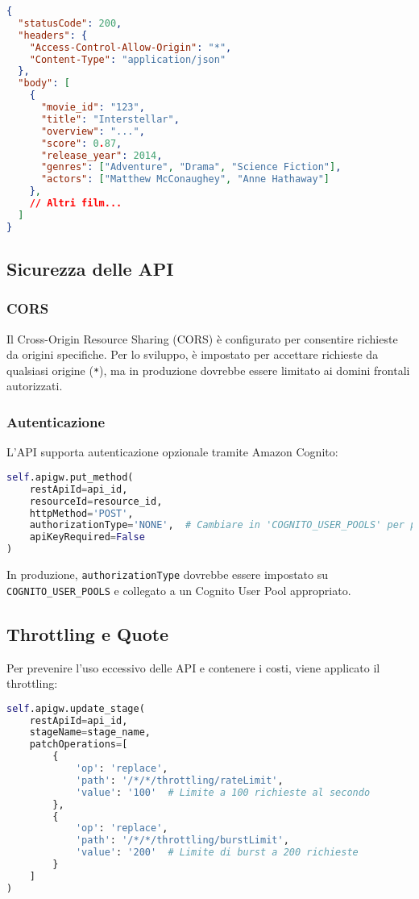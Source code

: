 \documentclass[11pt,a4paper]{article}
\begin{document}
\begin{lstlisting}[language=json]
{
  "statusCode": 200,
  "headers": {
    "Access-Control-Allow-Origin": "*",
    "Content-Type": "application/json"
  },
  "body": [
    {
      "movie_id": "123",
      "title": "Interstellar",
      "overview": "...",
      "score": 0.87,
      "release_year": 2014,
      "genres": ["Adventure", "Drama", "Science Fiction"],
      "actors": ["Matthew McConaughey", "Anne Hathaway"]
    },
    // Altri film...
  ]
}
\end{lstlisting}

\subsection{Sicurezza delle API}

\subsubsection{CORS}
Il Cross-Origin Resource Sharing (CORS) è configurato per consentire richieste da origini specifiche. Per lo sviluppo, è impostato per accettare richieste da qualsiasi origine (\texttt{*}), ma in produzione dovrebbe essere limitato ai domini frontali autorizzati.

\subsubsection{Autenticazione}
L'API supporta autenticazione opzionale tramite Amazon Cognito:

\begin{lstlisting}[language=Python]
self.apigw.put_method(
    restApiId=api_id,
    resourceId=resource_id,
    httpMethod='POST',
    authorizationType='NONE',  # Cambiare in 'COGNITO_USER_POOLS' per produzione
    apiKeyRequired=False
)
\end{lstlisting}

In produzione, \texttt{authorizationType} dovrebbe essere impostato su \texttt{COGNITO\_USER\_POOLS} e collegato a un Cognito User Pool appropriato.

\subsection{Throttling e Quote}
Per prevenire l'uso eccessivo delle API e contenere i costi, viene applicato il throttling:

\begin{lstlisting}[language=Python]
self.apigw.update_stage(
    restApiId=api_id,
    stageName=stage_name,
    patchOperations=[
        {
            'op': 'replace',
            'path': '/*/*/throttling/rateLimit',
            'value': '100'  # Limite a 100 richieste al secondo
        },
        {
            'op': 'replace',
            'path': '/*/*/throttling/burstLimit',
            'value': '200'  # Limite di burst a 200 richieste
        }
    ]
)
\end{lstlisting}
\end{document}
